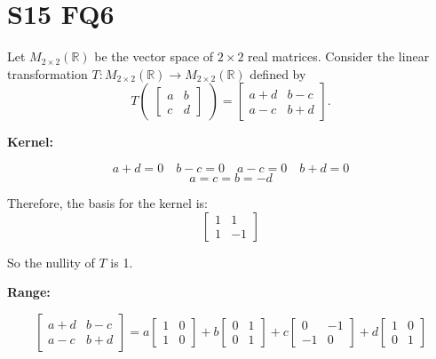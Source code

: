 \section{S15 FQ6}

Let $M_{2 \times 2}(\mathbb{R})$ be the vector space of $2 \times 2$ real matrices. Consider the linear transformation $T : M_{2 \times 2}(\mathbb{R}) \to M_{2 \times 2}(\mathbb{R})$ defined by
\[
    T \begin{pmatrix}
        \begin{bmatrix}
            a & b \\
            c & d
        \end{bmatrix}
    \end{pmatrix}
     = \begin{bmatrix}
        a + d & b - c \\
        a - c & b + d
    \end{bmatrix}.
\]

\textbf{Kernel:} 

\[
    a+d = 0 \quad b-c = 0 \quad a-c = 0 \quad b+d = 0
\]
\[
    a = c = b = -d
\]

Therefore, the basis for the kernel is: 
\[
    \begin{bmatrix}
        1 & 1 \\
        1 & -1
    \end{bmatrix}
\]

So the nullity of $T$ is 1.


\textbf{Range: }

\[
    \begin{bmatrix}
        a + d & b - c \\
        a - c & b + d
    \end{bmatrix}
    = a \begin{bmatrix}
        1 & 0 \\
        1 & 0
    \end{bmatrix}
    + b \begin{bmatrix}
        0 & 1 \\
        0 & 1
    \end{bmatrix}
    + c \begin{bmatrix}
        0 & -1 \\
        -1 & 0
    \end{bmatrix}
    + d \begin{bmatrix}
        1 & 0 \\
        0 & 1
    \end{bmatrix}
\]

